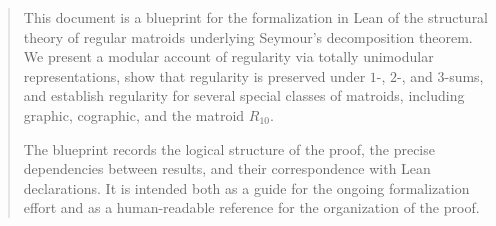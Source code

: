\begin{abstract}
This document is a blueprint for the formalization in Lean of the structural theory of regular matroids underlying Seymour’s decomposition theorem.  
We present a modular account of regularity via totally unimodular representations, show that regularity is preserved under $1$-, $2$-, and $3$-sums, and establish regularity for several special classes of matroids, including graphic, cographic, and the matroid $R_{10}$.  

The blueprint records the logical structure of the proof, the precise dependencies between results, and their correspondence with Lean declarations.  
It is intended both as a guide for the ongoing formalization effort and as a human-readable reference for the organization of the proof.
\end{abstract}
